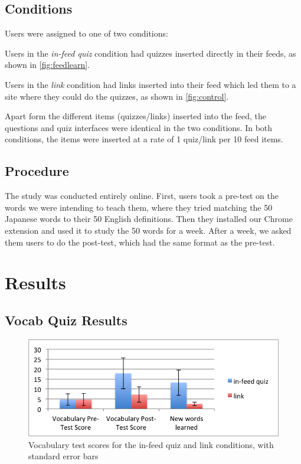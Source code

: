 \documentclass{chi-ext}
\begin{document}
\subsection{Conditions}

Users were assigned to one of two conditions:

\begin{compactitem}
\item Users in the \textit{in-feed quiz} condition had quizzes inserted directly in their feeds, as shown in \autoref{fig:feedlearn}.
\item Users in the \textit{link} condition had links inserted into their feed which led them to a site where they could do the quizzes, as shown in \autoref{fig:control}.
\end{compactitem}

Apart form the different items (quizzes/links) inserted into the feed, the questions and quiz interfaces were identical in the two conditions. In both conditions, the items were inserted at a rate of 1 quiz/link per 10 feed items.


\subsection{Procedure}

The study was conducted entirely online. First, users took a pre-test on the words we were intending to teach them, where they tried matching the 50 Japanese words to their 50 English definitions. Then they installed our Chrome extension and used it to study the 50 words for a week. After a week, we asked them users to do the post-test, which had the same format as the pre-test.

\section{Results}

\subsection{Vocab Quiz Results}

\begin{figure}
\centering
\includegraphics[width=1.0\columnwidth]{vocab-test-scores}
\caption{Vocabulary test scores for the in-feed quiz and link conditions, with standard error bars}
\label{fig:vocab-test-scores}
\end{figure}
\end{document}
